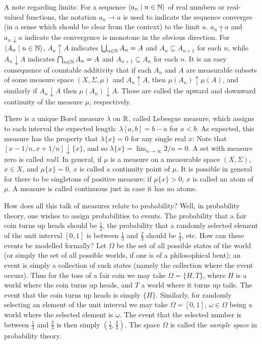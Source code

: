 \documentclass[leqno]{article}
\theoremstyle{definition}
\newcommand{\bldseq}[2]{\langle{#1}\mid{#2}\rangle}
\begin{document}
A note regarding limits: For a sequence $\bldseq{a_n}{n \in \N}$ of real numbers or real-valued functions, the notation $a_n \rightarrow a$ is used to indicate the sequence converges (in a sense which should be clear from the context) to the limit $a$. $a_n \uparrow a$ and $a_n \downarrow a$ indicate the convergence is monotone in the obvious direction. For $\bldseq{A_n}{n \in \N}$, $A_n \uparrow A$ indicates $\bigcup_{n \in \mathbb{N}} A_n = A$ and $A_n \subseteq A_{n+1}$ for each $n$, while $A_n \downarrow A$ indicates $\bigcap_{n \in \mathbb{N}} A_n = A$ and $A_{n+1} \subseteq A_n$ for each $n$. It is an easy consequence of countable additivity that if each $A_n$ and $A$ are measurable subsets of some measure space $(X, \Sigma, \mu)$ and $A_n \uparrow A$, then $\mu(A_n) \uparrow \mu(A)$, and similarly if $A_n \downarrow A$ then $\mu(A_n) \downarrow A$. These are called the upward and downward continuity of the measure $\mu$, respectively.

There is a unique Borel measure $\lambda$ on $\mathbb{R}$, called Lebesgue measure, which assigns to each interval the expected length: $\lambda [a,b] = b - a$ for $a < b$. As expected, this measure has the property that $\lambda \{x\} = 0$ for any single real $x$: Note that $[x - 1/n, x + 1/n] \downarrow \{x\}$, and so $\lambda \{x\} = \lim_{n \rightarrow \infty} 2/n = 0$. A set with measure zero is called {\em null}. In general, if $\mu$ is a measure on a measurable space $(X, \Sigma)$, $x \in X$, and $\mu \{x\} = 0$, $x$ is called a continuity point of $\mu$. It is possible in general for there to be singletons of positive measure; if $\mu \{x\} > 0$, $x$ is called an atom of $\mu$. A measure is called continuous just in case it has no atoms.

\medskip

How does all this talk of measures relate to probability? Well, in probability theory, one wishes to assign probabilities to events. The probability that a fair coin turns up heads should be $\frac{1}{2}$, the probability that a randomly selected element of the unit interval $[0,1]$ is between $\frac{1}{3}$ and $\frac{2}{3}$ should be $\frac{1}{3}$, etc. How can these events be modelled formally? Let $\Omega$ be the set of all possible states of the world (or simply the set of all possible worlds, if one is of a philosophical bent); an event is simply a collection of such states (namely the collection where the event occurs). Thus for the toss of a fair coin we may take $\Omega = \{H, T\}$, where $H$ is a world where the coin turns up heads, and $T$ a world where it turns up tails. The event that the coin turns up heads is simply $\{H\}$. Similarly, for randomly selecting an element of the unit interval we may take $\Omega = [0,1]$, $\omega \in \Omega$ being a world where the selected element is $\omega$. The event that the selected number is between $\frac{1}{3}$ and $\frac{2}{3}$ is then simply $(\frac{1}{3}, \frac{2}{3})$. The space $\Omega$ is called the {\em sample space} in probability theory.
\end{document}
